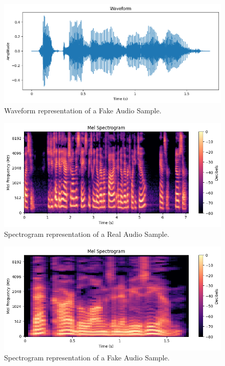 \documentclass[sigconf,authordraft]{acmart}
\begin{document}
\begin{figure}
  \centering
  \includegraphics[width=\linewidth]{images/fake_waveform.png}
  \caption{Waveform representation of a Fake Audio Sample.}
  \label{fig:fake_waveform}
\end{figure}

\begin{figure}
  \centering
  \includegraphics[width=\linewidth]{images/real_spectrogram.png}
  \caption{Spectrogram representation of a Real Audio Sample.}
  \label{fig:real_spectrogram}
\end{figure}

\begin{figure}
  \centering
  \includegraphics[width=\linewidth]{images/fake_spectrogram.png}
  \caption{Spectrogram representation of a Fake Audio Sample.}
  \label{fig:real_spectrogram}
\end{figure}
\end{document}
